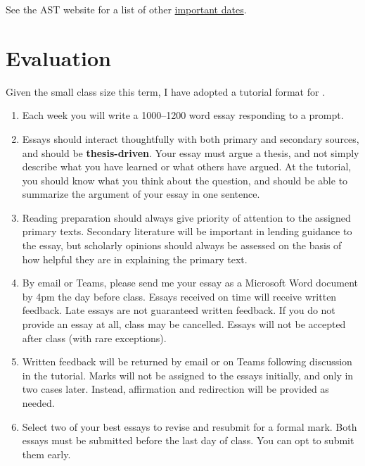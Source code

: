 \documentclass[titlepage]{article}
\begin{document}
See the AST website for a list of other \href{http://www.astheology.ns.ca/students/academic-dates.html}{important dates}.

\section{Evaluation}
\label{evaluation}

Given the small class size this term, I have adopted a tutorial format
for \ccode.

\begin{enumerate}

	\item Each week you will write a 1000–1200 word essay responding to
	a prompt.

	\item Essays should interact thoughtfully with both primary and
	secondary sources, and should be \textbf{thesis-driven}. Your essay
	must argue a thesis, and not simply describe what you have learned
	or what others have argued. At the tutorial, you should know what
	you think about the question, and should be able to summarize the
	argument of your essay in one sentence.

	\item Reading preparation should always give priority of attention
	to the assigned primary texts. Secondary literature will be
	important in lending guidance to the essay, but scholarly opinions
	should always be assessed on the basis of how helpful they are in
	explaining the primary text.

	\item By email or Teams, please send me your essay as a Microsoft
	Word document by 4pm the day before class. Essays received on time
	will receive written feedback. Late essays are not guaranteed
	written feedback. If you do not provide an essay at all, class may
	be cancelled. Essays will not be accepted after class (with rare
	exceptions).

	\item Written feedback will be returned by email or on Teams
	following discussion in the tutorial. Marks will not be assigned to
	the essays initially, and only in two cases later. Instead,
	affirmation and redirection will be provided as needed.

	\item Select two of your best essays to revise and resubmit for a
	formal mark. Both essays must be submitted before the last day of
	class. You can opt to submit them early.


\end{enumerate}
\end{document}
